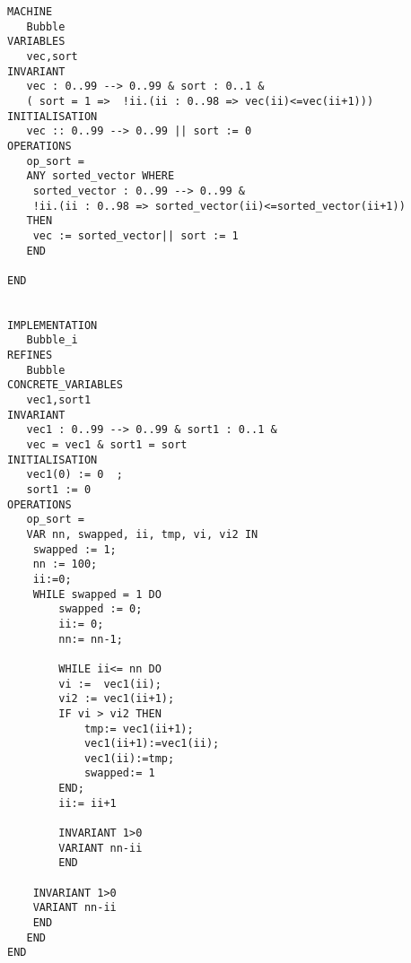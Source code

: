 \documentclass[10pt,a4paper]{article}
\begin{document}
\begin{verbatim}
MACHINE
   Bubble
VARIABLES
   vec,sort
INVARIANT
   vec : 0..99 --> 0..99 & sort : 0..1 &
   ( sort = 1 =>  !ii.(ii : 0..98 => vec(ii)<=vec(ii+1)))
INITIALISATION
   vec :: 0..99 --> 0..99 || sort := 0
OPERATIONS
   op_sort =
   ANY sorted_vector WHERE
    sorted_vector : 0..99 --> 0..99 &
    !ii.(ii : 0..98 => sorted_vector(ii)<=sorted_vector(ii+1))
   THEN
    vec := sorted_vector|| sort := 1
   END

END


IMPLEMENTATION
   Bubble_i
REFINES
   Bubble
CONCRETE_VARIABLES
   vec1,sort1
INVARIANT
   vec1 : 0..99 --> 0..99 & sort1 : 0..1 &
   vec = vec1 & sort1 = sort
INITIALISATION
   vec1(0) := 0  ;
   sort1 := 0
OPERATIONS
   op_sort =
   VAR nn, swapped, ii, tmp, vi, vi2 IN
	swapped := 1;
	nn := 100;
	ii:=0;
	WHILE swapped = 1 DO
		swapped := 0;
		ii:= 0;
		nn:= nn-1;

		WHILE ii<= nn DO
		vi :=  vec1(ii);
		vi2 := vec1(ii+1);
		IF vi > vi2 THEN
			tmp:= vec1(ii+1);
			vec1(ii+1):=vec1(ii);
			vec1(ii):=tmp;
			swapped:= 1
		END;
		ii:= ii+1

		INVARIANT 1>0
		VARIANT nn-ii
		END

	INVARIANT 1>0
	VARIANT nn-ii
	END
   END
END


\end{verbatim}
\end{document}
